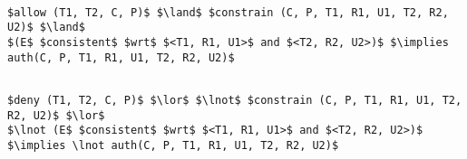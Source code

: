 \lstset{mathescape, language=AST} 
\begin{lstlisting}[frame=single, caption={$f^{+}_q$ for \ac{selinux}},label={lst:fqplusconstsel}]

$allow (T1, T2, C, P)$ $\land$ $constrain (C, P, T1, R1, U1, T2, R2, U2)$ $\land$
$(E$ $consistent$ $wrt$ $<T1, R1, U1>$ and $<T2, R2, U2>)$ $\implies auth(C, P, T1, R1, U1, T2, R2, U2)$ 

\end{lstlisting}

\lstset{mathescape, language=AST} 
\begin{lstlisting}[frame=single, caption={$f^{-}_q$ for \ac{selinux}},label={lst:fqminusconstsel}]

$deny (T1, T2, C, P)$ $\lor$ $\lnot$ $constrain (C, P, T1, R1, U1, T2, R2, U2)$ $\lor$
$\lnot (E$ $consistent$ $wrt$ $<T1, R1, U1>$ and $<T2, R2, U2>)$ $\implies \lnot auth(C, P, T1, R1, U1, T2, R2, U2)$ 

\end{lstlisting}






















